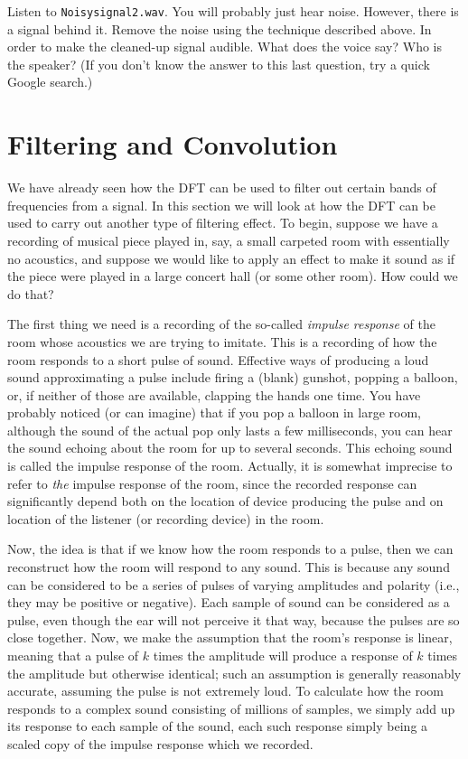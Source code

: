 \begin{problem}
Listen to \texttt{Noisysignal2.wav}. You will probably just hear noise. However, there is a signal behind it. Remove the noise using the technique described above. In order to make the cleaned-up signal audible. What does the voice say? Who is the speaker? (If you don't know the answer to this last question, try a quick Google search.)
\end{problem}


\section*{Filtering and Convolution}

We have already seen how the DFT can be used to filter out certain bands of frequencies from a signal. In this section we will look at how the DFT can be used to carry out another type of filtering effect. To begin, suppose we have a recording of musical piece played in, say, a small carpeted room with essentially no acoustics, and suppose we would like to apply an effect to make it sound as if the piece were played in a large concert hall (or some other room). How could we do that?

The first thing we need is a recording of the so-called \emph{impulse response} of the room whose acoustics we are trying to imitate. This is a recording of how the room responds to a short pulse of sound. Effective ways of producing a loud sound approximating a pulse include firing a (blank) gunshot, popping a balloon, or, if neither of those are available, clapping the hands one time. You have probably noticed (or can imagine) that if you pop a balloon in large room, although the sound of the actual pop only lasts a few milliseconds, you can hear the sound echoing about the room for up to several seconds. This echoing sound is called the impulse response of the room. Actually, it is somewhat imprecise to refer to \emph{the} impulse response of the room, since the recorded response can significantly depend both on the location of device producing the pulse and on location of the listener (or recording device) in the room.

Now, the idea is that if we know how the room responds to a pulse, then we can reconstruct how the room will respond to any sound. This is because any sound can be considered to be a series of pulses of varying amplitudes and polarity (i.e., they may be positive or negative). Each sample of sound can be considered as a pulse, even though the ear will not perceive it that way, because the pulses are so close together. Now, we make the assumption that the room's response is linear, meaning that a pulse of $k$ times the amplitude will produce a response of $k$ times the amplitude but otherwise identical; such an assumption is generally reasonably accurate, assuming the pulse is not extremely loud. To calculate how the room responds to a complex sound consisting of millions of samples, we simply add up its response to each sample of the sound, each such response simply being a scaled copy of the impulse response which we recorded.

